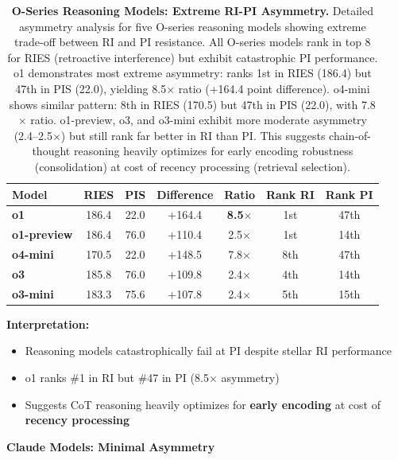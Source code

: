 \documentclass{article}
\begin{document}
\begin{table}[t]
\centering
\caption{\textbf{O-Series Reasoning Models: Extreme RI-PI Asymmetry.}
Detailed asymmetry analysis for five O-series reasoning models showing extreme trade-off between RI and PI resistance.
All O-series models rank in top 8 for RIES (retroactive interference) but exhibit catastrophic PI performance.
o1 demonstrates most extreme asymmetry: ranks 1st in RIES (186.4) but 47th in PIS (22.0), yielding 8.5$\times$ ratio (+164.4 point difference).
o4-mini shows similar pattern: 8th in RIES (170.5) but 47th in PIS (22.0), with 7.8$\times$ ratio.
o1-preview, o3, and o3-mini exhibit more moderate asymmetry (2.4--2.5$\times$) but still rank far better in RI than PI.
This suggests chain-of-thought reasoning heavily optimizes for early encoding robustness (consolidation) at cost of recency processing (retrieval selection).}
\begin{tabular}{lcccccc}
\toprule
Model & RIES & PIS & Difference & Ratio & Rank RI & Rank PI \\
\midrule
\textbf{o1} & 186.4 & 22.0 & +164.4 & \textbf{8.5$\times$} & 1st & 47th \\
\textbf{o1-preview} & 186.4 & 76.0 & +110.4 & 2.5$\times$ & 1st & 14th \\
\textbf{o4-mini} & 170.5 & 22.0 & +148.5 & 7.8$\times$ & 8th & 47th \\
\textbf{o3} & 185.8 & 76.0 & +109.8 & 2.4$\times$ & 4th & 14th \\
\textbf{o3-mini} & 183.3 & 75.6 & +107.8 & 2.4$\times$ & 5th & 15th \\
\bottomrule
\end{tabular}
\end{table}

\textbf{Interpretation:}
\begin{itemize}[itemsep=2pt,topsep=3pt,parsep=0pt]
    \item Reasoning models catastrophically fail at PI despite stellar RI performance
    \item o1 ranks \#1 in RI but \#47 in PI (8.5$\times$ asymmetry)
    \item Suggests CoT reasoning heavily optimizes for \textbf{early encoding} at cost of \textbf{recency processing}
\end{itemize}

\textbf{Claude Models: Minimal Asymmetry}
\end{document}
